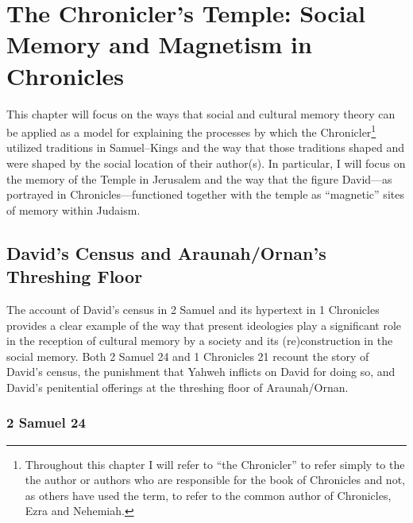 
\hypertarget{the-chroniclers-temple-social-memory-and-magnetism-in-chronicles}{%
\chapter{The Chronicler's Temple: Social Memory and Magnetism in Chronicles}\label{the-chroniclers-temple-social-memory-and-magnetism-in-chronicles}} 

 

 This chapter will focus on the ways that social and cultural memory theory can be applied as a model for explaining the processes by which the Chronicler\footnote{Throughout this chapter I will refer to ``the   Chronicler'' to refer simply to the the author or authors who are   responsible for the book of Chronicles and not, as others have used   the term, to refer to the common author of Chronicles, Ezra and   Nehemiah.} utilized traditions in Samuel--Kings and the way that those traditions shaped and were shaped by the social location of their author(s). In particular, I will focus on the memory of the Temple in Jerusalem and the way that the figure David---as portrayed in Chronicles---functioned together with the temple as ``magnetic'' sites of memory within \secondtemple Judaism.\autocite[73]{benzvi_st2017} 

 \hypertarget{davids-census-and-araunahornans-threshing-floor}{%
 \section{David's Census and Araunah/Ornan's Threshing Floor}\label{davids-census-and-araunahornans-threshing-floor}} 

 The account of David's census in 2 Samuel and its hypertext in 1 Chronicles provides a clear example of the way that present ideologies play a significant role in the reception of cultural memory by a society and its (re)construction in the social memory. Both 2 Samuel 24 and 1 Chronicles 21 recount the story of David's census, the punishment that Yahweh inflicts on David for doing so, and David's penitential offerings at the threshing floor of Araunah/Ornan. 

 \hypertarget{samuel-24}{%
 \subsection{2 Samuel 24}\label{samuel-24}} 

